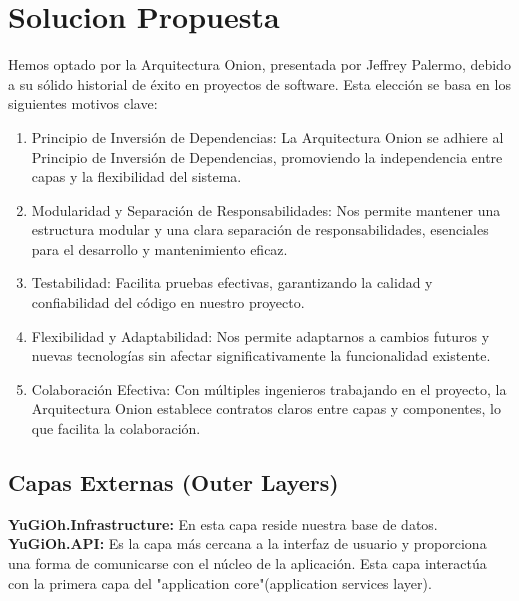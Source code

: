 \documentclass[a4paper]{article}
\begin{document}
\section{Solucion Propuesta}
Hemos optado por la Arquitectura Onion, presentada por Jeffrey Palermo, debido a
su sólido historial de éxito en proyectos de software. Esta elección se basa en los
siguientes motivos clave:
\begin{enumerate}
\item Principio de Inversión de Dependencias: La Arquitectura Onion se adhiere al
Principio de Inversión de Dependencias, promoviendo la independencia entre
capas y la flexibilidad del sistema.
\item Modularidad y Separación de Responsabilidades: Nos permite mantener una
estructura modular y una clara separación de responsabilidades, esenciales
para el desarrollo y mantenimiento eficaz.
\item Testabilidad: Facilita pruebas efectivas, garantizando la calidad y confiabilidad
del código en nuestro proyecto.
\item Flexibilidad y Adaptabilidad: Nos permite adaptarnos a cambios futuros y
nuevas tecnologías sin afectar significativamente la funcionalidad existente.
\item Colaboración Efectiva: Con múltiples ingenieros trabajando en el proyecto, la
Arquitectura Onion establece contratos claros entre capas y componentes, lo
que facilita la colaboración.
\end{enumerate}
\subsection{Capas Externas (Outer Layers)}
\textbf{YuGiOh.Infrastructure:} En esta capa reside nuestra base de datos.\\
\textbf{YuGiOh.API:} Es la capa más cercana a la interfaz de usuario y proporciona una
forma de comunicarse con el núcleo de la aplicación. Esta capa interactúa con la
primera capa del "application core"(application services layer).
\end{document}
